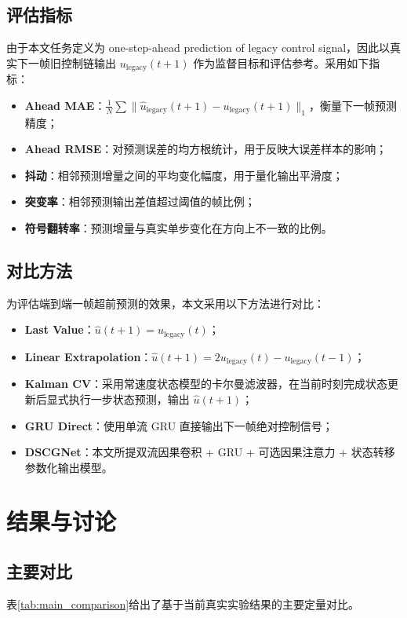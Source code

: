 \documentclass[journal]{IEEEtran}
\begin{document}
\subsection{评估指标}
由于本文任务定义为 one-step-ahead prediction of legacy control signal，因此以真实下一帧旧控制链输出 $u_{\mathrm{legacy}}(t+1)$ 作为监督目标和评估参考。采用如下指标：
\begin{itemize}
\item \textbf{Ahead MAE}：$\frac{1}{N}\sum \|\hat{u}_{\mathrm{legacy}}(t+1)-u_{\mathrm{legacy}}(t+1)\|_1$，衡量下一帧预测精度；
\item \textbf{Ahead RMSE}：对预测误差的均方根统计，用于反映大误差样本的影响；
\item \textbf{抖动}：相邻预测增量之间的平均变化幅度，用于量化输出平滑度；
\item \textbf{突变率}：相邻预测输出差值超过阈值的帧比例；
\item \textbf{符号翻转率}：预测增量与真实单步变化在方向上不一致的比例。
\end{itemize}

\subsection{对比方法}
为评估端到端一帧超前预测的效果，本文采用以下方法进行对比：
\begin{itemize}
\item \textbf{Last Value}：$\hat{u}(t+1)=u_{\mathrm{legacy}}(t)$；
\item \textbf{Linear Extrapolation}：$\hat{u}(t+1)=2u_{\mathrm{legacy}}(t)-u_{\mathrm{legacy}}(t-1)$；
\item \textbf{Kalman CV}：采用常速度状态模型的卡尔曼滤波器，在当前时刻完成状态更新后显式执行一步状态预测，输出 $\hat{u}(t+1)$；
\item \textbf{GRU Direct}：使用单流 GRU 直接输出下一帧绝对控制信号；
\item \textbf{DSCGNet}：本文所提双流因果卷积 + GRU + 可选因果注意力 + 状态转移参数化输出模型。
\end{itemize}

\section{结果与讨论}

\subsection{主要对比}
表\ref{tab:main_comparison}给出了基于当前真实实验结果的主要定量对比。
\end{document}
